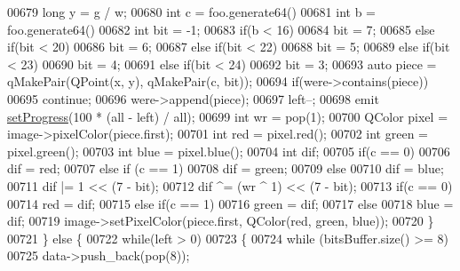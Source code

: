 \begin{DoxyCode}
00679             \textcolor{keywordtype}{long} y = g / w;
00680             \textcolor{keywordtype}{int} c = foo.generate64() %
00681             \textcolor{keywordtype}{int} b = foo.generate64() %
00682             \textcolor{keywordtype}{int} bit = -1;
00683             \textcolor{keywordflow}{if}(b < 16)
00684                 bit = 7;
00685             \textcolor{keywordflow}{else} \textcolor{keywordflow}{if}(bit < 20)
00686                 bit = 6;
00687             \textcolor{keywordflow}{else} \textcolor{keywordflow}{if}(bit < 22)
00688                 bit = 5;
00689             \textcolor{keywordflow}{else} \textcolor{keywordflow}{if}(bit < 23)
00690                 bit = 4;
00691             \textcolor{keywordflow}{else} \textcolor{keywordflow}{if}(bit < 24)
00692                 bit = 3;
00693             \textcolor{keyword}{auto} piece = qMakePair(QPoint(x, y), qMakePair(c, bit));
00694             \textcolor{keywordflow}{if}(were->contains(piece))
00695                 \textcolor{keywordflow}{continue};
00696             were->append(piece);
00697             left--;
00698             emit \hyperlink{class_model_p_c_afdcd80f0ed5062e145a71f09b0897547}{setProgress}(100 * (all - left) / all);
00699             \textcolor{keywordtype}{int} wr = pop(1);
00700             QColor pixel = image->pixelColor(piece.first);
00701             \textcolor{keywordtype}{int} red = pixel.red();
00702             \textcolor{keywordtype}{int} green = pixel.green();
00703             \textcolor{keywordtype}{int} blue = pixel.blue();
00704             \textcolor{keywordtype}{int} dif;
00705             \textcolor{keywordflow}{if}(c == 0)
00706                 dif = red;
00707             \textcolor{keywordflow}{else} \textcolor{keywordflow}{if} (c == 1)
00708                 dif = green;
00709             \textcolor{keywordflow}{else}
00710                 dif = blue;
00711             dif |= 1 << (7 - bit);
00712             dif ^= (wr ^ 1) << (7 - bit);
00713             \textcolor{keywordflow}{if}(c == 0)
00714                 red = dif;
00715             \textcolor{keywordflow}{else} \textcolor{keywordflow}{if}(c == 1)
00716                 green = dif;
00717             \textcolor{keywordflow}{else}
00718                 blue = dif;
00719             image->setPixelColor(piece.first, QColor(red, green, blue));
00720         \}
00721     \} \textcolor{keywordflow}{else} \{
00722         \textcolor{keywordflow}{while}(left > 0)
00723         \{
00724             \textcolor{keywordflow}{while} (bitsBuffer.size() >= 8)
00725                 data->push\_back(pop(8));

\end{DoxyCode}
